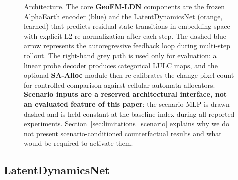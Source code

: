 \documentclass{article}
\begin{document}
\begin{figure}[htbp]
{
}
\caption{Architecture. The core \textbf{GeoFM-LDN} components are the frozen AlphaEarth encoder (blue) and the LatentDynamicsNet (orange, learned) that predicts residual state transitions in embedding space with explicit L2 re-normalization after each step. The dashed blue arrow represents the autoregressive feedback loop during multi-step rollout. The right-hand grey path is used only for evaluation: a linear probe decoder produces categorical LULC maps, and the optional \textbf{SA-Alloc} module then re-calibrates the change-pixel count for controlled comparison against cellular-automata allocators. \textbf{Scenario inputs are a reserved architectural interface, not an evaluated feature of this paper}: the scenario MLP is drawn dashed and is held constant at the baseline index during all reported experiments. Section~\ref{sec:limitations_scenario} explains why we do not present scenario-conditioned counterfactual results and what would be required to activate them.}
\label{fig:architecture}
\end{figure}

\subsection{LatentDynamicsNet}
\label{sec:network}
\end{document}
